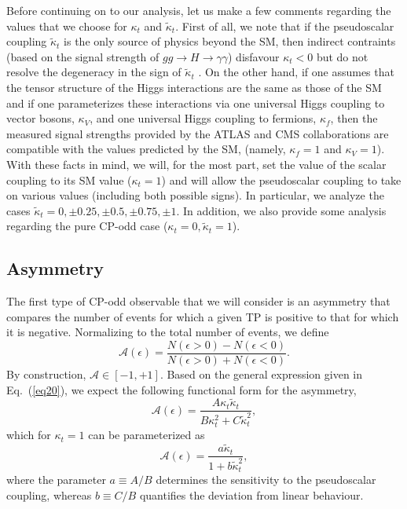 \documentclass[aps,preprint,tightenlines,floatfix,superscriptaddress,nofootinbib,showpacs]{revtex4-1}
\def\beq{\begin{equation}}
\def\eeq{\end{equation}}
\def\kp{\kappa_t}
\def\kpt{\tilde{\kappa}_t}
\begin{document}
Before continuing on to our analysis, let us make a few comments
regarding the values that we choose for $\kp$ and $\kpt$.
First of all, we note that if the pseudoscalar
coupling $\kpt$ is the only source of physics beyond the SM,
then indirect contraints (based on the signal strength of $gg\to H \to \gamma\gamma$) 
disfavour $\kp < 0$ but do not
resolve the degeneracy in the sign of $\kpt$ \cite{Guadagnoli}. On
the other hand, if one assumes that the tensor structure of the
Higgs interactions are the
same as those of the SM and if one parameterizes these interactions via
one universal Higgs coupling to vector bosons, $\kappa_V$, and one
universal Higgs coupling to fermions, $\kappa_f$, then the measured signal
strengths provided by the ATLAS and CMS collaborations are compatible with
the values predicted by the SM, (namely, $\kappa_f=1$ and $\kappa_V=1$).
With these facts in mind, we will, for the most part,
set the value of the scalar coupling to its SM
value ($\kp=1$) and will allow the pseudoscalar coupling to take on
various values (including both possible signs). In particular, we
analyze the cases $\kpt=0,\pm 0.25, \pm 0.5, \pm 0.75,\pm 1$.
In addition, we also provide some analysis regarding the pure
$\mathrm{CP}$-odd case ($\kp=0,\kpt=1$).
\subsection{Asymmetry}
\label{sec3.1}

The first type of $\mathrm{CP}$-odd observable that we will consider is an
asymmetry that compares the number of events
for which a given TP is positive to that for which it is negative.
Normalizing to the total number of events, we define
%
\beq
\label{eq21}
\mathcal{A}(\epsilon)=\frac{N(\epsilon > 0)-N(\epsilon < 0)}{N(\epsilon > 0)+N(\epsilon < 0)}.
\eeq 
%
By construction, $\mathcal{A}\in [-1,+1]$.
Based on the general expression given in Eq.~(\ref{eq20}), we expect
the following functional form for the asymmetry,
%
\beq
\label{eq22}
\mathcal{A}(\epsilon)=\frac{A\kp\kpt}{B\kappa^2_t+C\tilde{\kappa}^2_t},
\eeq 
%
which for $\kp=1$ can be parameterized as
%
\beq
\label{eq23}
\mathcal{A}(\epsilon)=\frac{a\kpt}{1+b\tilde{\kappa}^2_t},
\eeq 
%
where the parameter $a\equiv A/B$ determines the sensitivity to the
pseudoscalar coupling, whereas $b\equiv C/B$ quantifies the deviation
from linear behaviour.
\end{document}
